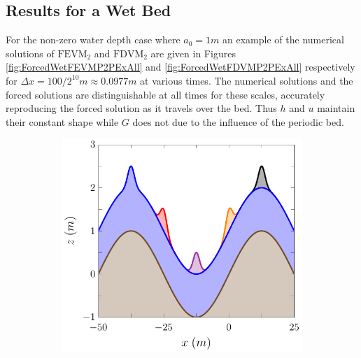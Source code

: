 \subsection{Results for a Wet Bed} 
For the non-zero water depth case where $a_0 = 1m$ an example of the numerical solutions of $\text{FEVM}_2$ and $\text{FDVM}_2$ are given in Figures \ref{fig:ForcedWetFEVMP2PExAll} and \ref{fig:ForcedWetFDVMP2PExAll} respectively for $\Delta x = 100/ 2^{10} m \approx 0.0977m $ at various times. The numerical solutions and the forced solutions are distinguishable at all times for these scales, accurately reproducing the forced solution as it travels over the bed. Thus $h$ and $u$ maintain their constant shape while $G$ does not due to the influence of the periodic bed.
\begin{figure}
	\centering
	\begin{subfigure}{0.5\textwidth}
		\includegraphics[width=\textwidth]{./chp5/figures/Forced/Wet/FEVMw.pdf}
		\vspace{0.5cm}
	\end{subfigure}%
	\begin{subfigure}{0.5\textwidth}

\end{subfigure}
\end{figure}
